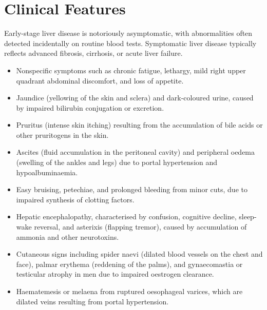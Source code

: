 \section*{Clinical Features}
Early-stage liver disease is notoriously asymptomatic, with abnormalities often detected incidentally on routine blood tests. Symptomatic liver disease typically reflects advanced fibrosis, cirrhosis, or acute liver failure.
\begin{itemize}
    \item Nonspecific symptoms such as chronic fatigue, lethargy, mild right upper quadrant abdominal discomfort, and loss of appetite.
    \item Jaundice (yellowing of the skin and sclera) and dark-coloured urine, caused by impaired bilirubin conjugation or excretion.
    \item Pruritus (intense skin itching) resulting from the accumulation of bile acids or other pruritogens in the skin.
    \item Ascites (fluid accumulation in the peritoneal cavity) and peripheral oedema (swelling of the ankles and legs) due to portal hypertension and hypoalbuminaemia.
    \item Easy bruising, petechiae, and prolonged bleeding from minor cuts, due to impaired synthesis of clotting factors.
    \item Hepatic encephalopathy, characterised by confusion, cognitive decline, sleep-wake reversal, and asterixis (flapping tremor), caused by accumulation of ammonia and other neurotoxins.
    \item Cutaneous signs including spider naevi (dilated blood vessels on the chest and face), palmar erythema (reddening of the palms), and gynaecomastia or testicular atrophy in men due to impaired oestrogen clearance.
    \item Haematemesis or melaena from ruptured oesophageal varices, which are dilated veins resulting from portal hypertension.
\end{itemize}

